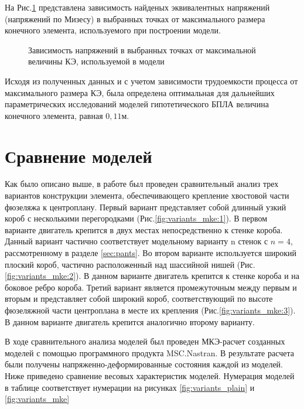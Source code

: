 На Рис.\ref{fig:stressToDiscreteness} представлена зависимость найденых эквивалентных напряжений (напряжений по Мизесу) в выбранных точках от максимального размера конечного элемента, используемого при построении модели. 

\begin{figure}[H]
\centering
\def\svgwidth{\textwidth}

\caption{Зависимость напряжений в выбранных точках от максимальной величины КЭ, используемой в модели}
\label{fig:stressToDiscreteness}
\end{figure}


	

Исходя из полученных данных и с учетом зависимости трудоемкости процесса от максимального размера КЭ, была определена оптимальная для дальнейших параметрических исследований моделей гипотетического БПЛА величина конечного элемента, равная $0,11\text{м}$. 


\section{Сравнение моделей}

Как было описано выше, в работе был проведен сравнительный анализ трех вариантов конструкции элемента, обеспечивающего крепление хвостовой части фюзеляжа к центроплану. Первый вариант представляет собой длинный узкий короб с несколькими перегородками (Рис.\ref{fig:variants_mke:1}). В первом варианте двигатель крепится в двух местах непосредственно к стенке короба. Данный вариант частично соответствует модельному варианту n стенок с $n = 4$, рассмотренному в разделе \ref{sec:pants}. Во втором варианте используется широкий плоский короб, частично расположенный над шассийной нишей (Рис.\ref{fig:variants_mke:2}). В данном варианте двигатель крепится к стенке короба и на боковое ребро короба. Третий вариант является промежуточным между первым и вторым и представляет собой широкий короб, соответствующий по высоте фюзеляжной части центроплана в месте их крепления (Рис.\ref{fig:variants_mke:3}). В данном варианте двигатель крепится аналогично второму варианту. 

В ходе сравнительного анализа моделей был проведен МКЭ-расчет созданных моделей с помощью программного продукта MSC.Nastran. В результате расчета были получены напряженно-деформированные состояния каждой из моделей. Ниже приведено сравнение весовых характеристик моделей. Нумерация моделей в таблице соответствует нумерации на рисунках \ref{fig:variants_plain} и \ref{fig:variants_mke}

